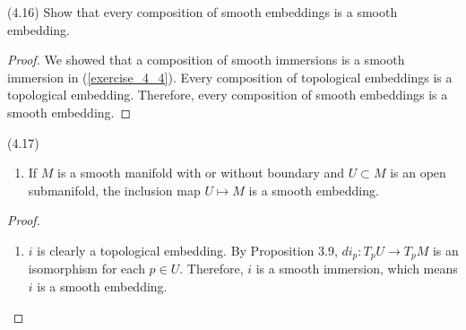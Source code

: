 \begin{customexer}{(4.16)}
  Show that every composition of smooth embeddings is a smooth embedding.
\end{customexer}

\begin{proof}
  We showed that a composition of smooth immersions is a smooth immersion in (\ref{exercise_4_4}).
  Every composition of topological embeddings is a topological embedding.
  Therefore, every composition of smooth embeddings is a smooth embedding.
\end{proof}

\begin{customexmp}{(4.17)}
  $ $
  \begin{enumerate}[label=(\alph*)]
    \item 
      If $M$ is a smooth manifold with or without boundary and $U \subset M$ is an open submanifold, the inclusion map $U \mapsto M$ is a smooth embedding.
  \end{enumerate}
\end{customexmp}

\begin{proof}
  $ $
  \begin{enumerate}[label=(\alph*)]
    \item 
      $i$ is clearly a topological embedding.
      By Proposition 3.9, $di_p: T_pU \rightarrow T_pM$ is an isomorphism for each $p \in U$.
      Therefore, $i$ is a smooth immersion, which means $i$ is a smooth embedding.
  \end{enumerate}
\end{proof}
